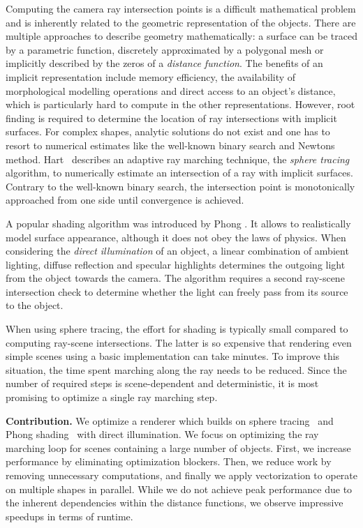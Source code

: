 \documentclass[letterpaper]{article}
\newcommand{\mypar}[1]{{\bf #1.}}
\begin{document}
Computing the camera ray intersection points is a difficult mathematical problem and is inherently related to the geometric representation of the objects. There are multiple approaches to describe geometry mathematically: a surface can be traced by a parametric function, discretely approximated by a polygonal mesh or implicitly described by the zeros of a \emph{distance function}. The benefits of an implicit representation include memory efficiency, the availability of morphological modelling operations and direct access to an object's distance, which is particularly hard to compute in the other representations. However, root finding is required to determine the location of ray intersections with implicit surfaces. For complex shapes, analytic solutions do not exist and one has to resort to numerical estimates like the well-known binary search and Newtons method. Hart~\cite{Hart1995} describes an adaptive ray marching technique, the \emph{sphere tracing} algorithm, to numerically estimate an intersection of a ray with implicit surfaces. Contrary to the well-known binary search, the intersection point is monotonically approached from one side until convergence is achieved. 

A popular shading algorithm was introduced by Phong \cite{Phong1975}. It allows to realistically model surface appearance, although it does not obey the laws of physics. When considering the \emph{direct illumination} of an object, a linear combination of ambient lighting, diffuse reflection and specular highlights determines the outgoing light from the object towards the camera. The algorithm requires a second ray-scene intersection check to determine whether the light can freely pass from its source to the object.

When using sphere tracing, the effort for shading is typically small compared to computing ray-scene intersections. The latter is so expensive that rendering even simple scenes using a basic implementation can take minutes. To improve this situation, the time spent marching along the ray needs to be reduced. Since the number of required steps is scene-dependent and deterministic, it is most promising to optimize a single ray marching step.

\mypar{Contribution}
We optimize a renderer which builds on sphere tracing~\cite{Hart1995} and Phong shading~\cite{Phong1975} with direct illumination. We focus on optimizing the ray marching loop for scenes containing a large number of objects. First, we increase performance by eliminating optimization blockers. Then, we reduce work by removing unnecessary computations, and finally we apply vectorization to operate on multiple shapes in parallel. While we do not achieve peak performance due to the inherent dependencies within the distance functions, we observe impressive speedups in terms of runtime.
\end{document}
